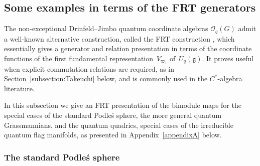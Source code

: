 \documentclass[10pt,a4paper]{amsart}
\numberwithin{equation}{section}
\begin{document}
\subsection{Some examples in terms of the FRT generators} \label{subsection:FRT}

The non-exceptional Drinfeld--Jimbo quantum coordinate algebras $\mathcal{O}_q(G)$ admit a well-known alternative construction, called the FRT construction \cite{FRT89}, which essentially gives a generator and relation presentation in terms of the coordinate functions of the first fundamental representation~$V_{\varpi_1}$ of~$U_q(\mathfrak{g})$. It proves useful when explicit commutation relations are required, as in Section~\ref{subsection:Takeuchi} below, and is commonly used in the $C^*$-algebra literature.

In this subsection we give an FRT presentation of the bimodule maps for the special cases of the standard Podle\'s sphere, the more general quantum Grassmannians, and the quantum quadrics, special cases of the irreducible quantum flag manifolds, as presented in Appendix~\ref{appendixA} below.

\subsubsection{The standard Podle\'s sphere}
\end{document}
